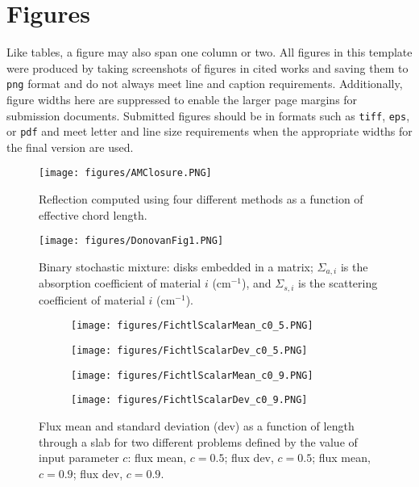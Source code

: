 \documentclass{nseJournal}
\begin{document}
\section{Figures}
\label{sec:figures}

Like tables, a figure may also span one column or two.
All figures in this template were produced by taking screenshots of figures in cited works and saving them to \texttt{png} format and do not always meet line and caption requirements.
Additionally, figure widths here are suppressed to enable the larger page margins for submission documents.
Submitted figures should be in formats such as \texttt{tiff}, \texttt{eps}, or \texttt{pdf} and meet letter and line size requirements when the appropriate widths for the final version are used.

\begin{figure}[t]%
  \centering
  \texttt{[image: figures/AMClosure.PNG]}
  \caption{Reflection computed using four different methods as a function of effective chord length.}
  \label{fig:AMClosure}
\end{figure}

\begin{figure}%
  \centering
  \texttt{[image: figures/DonovanFig1.PNG]}
  \caption{Binary stochastic mixture: disks embedded in a matrix; $\Sigma_{a,i}$ is the absorption coefficient of material $i$ (cm$^{-1}$), and $\Sigma_{s,i}$ is the scattering coefficient of material $i$ (cm$^{-1}$).}
  \label{fig:DonovanFig1}
\end{figure}

\begin{figure}%
  \centering
  \begin{subfigure}[b]{0.475\textwidth}
    \centering
    \texttt{[image: figures/FichtlScalarMean\_c0\_5.PNG]}
    \caption{}
    \label{fig:FP:parta}
  \end{subfigure}
  \begin{subfigure}[b]{0.475\textwidth}
    \centering
    \texttt{[image: figures/FichtlScalarDev\_c0\_5.PNG]}
    \caption{}
    \label{fig:FP:partb}
  \end{subfigure}
  \begin{subfigure}[b]{0.475\textwidth}
    \centering
    \texttt{[image: figures/FichtlScalarMean\_c0\_9.PNG]}
    \caption{}
    \label{fig:FP:partc}
  \end{subfigure}
  \begin{subfigure}[b]{0.475\textwidth}
    \centering
    \texttt{[image: figures/FichtlScalarDev\_c0\_9.PNG]}
    \caption{}
    \label{fig:FP:partd}
  \end{subfigure}
  \caption{Flux mean and standard deviation (dev) as a function of length through a slab for two different problems defined by the value of input parameter $c$: \protect{} flux mean, $c = 0.5$; \protect{} flux dev, $c = 0.5$; \protect{} flux mean, $c = 0.9$; \protect{} flux dev, $c = 0.9$.}
  \label{fig:FluxPlots}
\end{figure}
\end{document}
